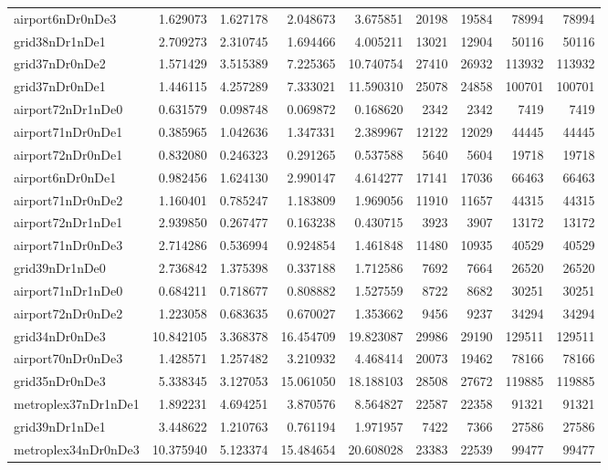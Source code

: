 \begin{longtable}{|l|r|r|r|r|r|r|r|r|}
airport6nDr0nDe3 & 1.629073 & 1.627178 & 2.048673 & 3.675851 & 20198 & 19584 & 78994 & 78994 \\
grid38nDr1nDe1 & 2.709273 & 2.310745 & 1.694466 & 4.005211 & 13021 & 12904 & 50116 & 50116 \\
grid37nDr0nDe2 & 1.571429 & 3.515389 & 7.225365 & 10.740754 & 27410 & 26932 & 113932 & 113932 \\
grid37nDr0nDe1 & 1.446115 & 4.257289 & 7.333021 & 11.590310 & 25078 & 24858 & 100701 & 100701 \\
airport72nDr1nDe0 & 0.631579 & 0.098748 & 0.069872 & 0.168620 & 2342 & 2342 & 7419 & 7419 \\
airport71nDr0nDe1 & 0.385965 & 1.042636 & 1.347331 & 2.389967 & 12122 & 12029 & 44445 & 44445 \\
airport72nDr0nDe1 & 0.832080 & 0.246323 & 0.291265 & 0.537588 & 5640 & 5604 & 19718 & 19718 \\
airport6nDr0nDe1 & 0.982456 & 1.624130 & 2.990147 & 4.614277 & 17141 & 17036 & 66463 & 66463 \\
airport71nDr0nDe2 & 1.160401 & 0.785247 & 1.183809 & 1.969056 & 11910 & 11657 & 44315 & 44315 \\
airport72nDr1nDe1 & 2.939850 & 0.267477 & 0.163238 & 0.430715 & 3923 & 3907 & 13172 & 13172 \\
airport71nDr0nDe3 & 2.714286 & 0.536994 & 0.924854 & 1.461848 & 11480 & 10935 & 40529 & 40529 \\
grid39nDr1nDe0 & 2.736842 & 1.375398 & 0.337188 & 1.712586 & 7692 & 7664 & 26520 & 26520 \\
airport71nDr1nDe0 & 0.684211 & 0.718677 & 0.808882 & 1.527559 & 8722 & 8682 & 30251 & 30251 \\
airport72nDr0nDe2 & 1.223058 & 0.683635 & 0.670027 & 1.353662 & 9456 & 9237 & 34294 & 34294 \\
grid34nDr0nDe3 & 10.842105 & 3.368378 & 16.454709 & 19.823087 & 29986 & 29190 & 129511 & 129511 \\
airport70nDr0nDe3 & 1.428571 & 1.257482 & 3.210932 & 4.468414 & 20073 & 19462 & 78166 & 78166 \\
grid35nDr0nDe3 & 5.338345 & 3.127053 & 15.061050 & 18.188103 & 28508 & 27672 & 119885 & 119885 \\
metroplex37nDr1nDe1 & 1.892231 & 4.694251 & 3.870576 & 8.564827 & 22587 & 22358 & 91321 & 91321 \\
grid39nDr1nDe1 & 3.448622 & 1.210763 & 0.761194 & 1.971957 & 7422 & 7366 & 27586 & 27586 \\
metroplex34nDr0nDe3 & 10.375940 & 5.123374 & 15.484654 & 20.608028 & 23383 & 22539 & 99477 & 99477 \\

\end{longtable}
